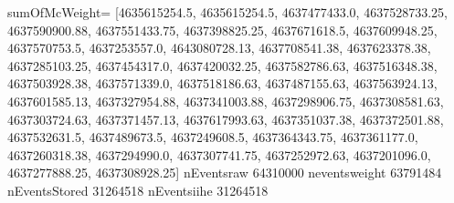 sumOfMcWeight=
[4635615254.5, 4635615254.5, 4637477433.0, 4637528733.25, 4637590900.88, 4637551433.75, 4637398825.25, 4637671618.5, 4637609948.25, 4637570753.5, 4637253557.0, 4643080728.13, 4637708541.38, 4637623378.38, 4637285103.25, 4637454317.0, 4637420032.25, 4637582786.63, 4637516348.38, 4637503928.38, 4637571339.0, 4637518186.63, 4637487155.63, 4637563924.13, 4637601585.13, 4637327954.88, 4637341003.88, 4637298906.75, 4637308581.63, 4637303724.63, 4637371457.13, 4637617993.63, 4637351037.38, 4637372501.88, 4637532631.5, 4637489673.5, 4637249608.5, 4637364343.75, 4637361177.0, 4637260318.38, 4637294990.0, 4637307741.75, 4637252972.63, 4637201096.0, 4637277888.25, 4637308928.25]
nEventsraw 64310000   
neventsweight 63791484   
nEventsStored 31264518   
nEventsiihe 31264518   
